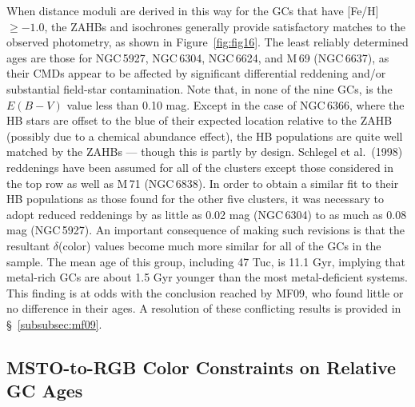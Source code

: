 \documentclass[12pt,preprint]{aastex}
\begin{document}
When distance moduli are derived in this way for the GCs that have [Fe/H] $\ge
-1.0$, the ZAHBs and isochrones generally provide satisfactory matches to the
observed photometry, as shown in Figure~\ref{fig:fig16}.  The least reliably
determined ages are those for NGC$\,$5927, NGC$\,$6304, NGC$\,$6624, and M$\,$69
(NGC$\,$6637), as their CMDs appear to be affected by significant differential
reddening and/or substantial field-star contamination.  Note that, in none of
the nine GCs, is the $E(B-V)$ value less than 0.10 mag.  Except in the case of
NGC$\,$6366, where the HB stars are offset to the blue of their expected 
location relative to the ZAHB (possibly due to a chemical abundance effect),
the HB populations are quite well matched by the ZAHBs --- though
this is partly by design.  Schlegel et al.~(1998) reddenings have been assumed
for all of the clusters except those considered in the top row as well as
M$\,$71 (NGC$\,$6838).   In order to obtain a similar fit to their HB
populations as those found for the other five clusters, it was necessary to
adopt reduced reddenings by as little as 0.02 mag (NGC$\,$6304) to as much as
0.08 mag (NGC$\,$5927).  An important consequence of making such revisions is
that the resultant $\delta$(color) values become much more similar for all of
the GCs in the sample.  The mean age of this group, including 47 Tuc, is 11.1
Gyr, implying that metal-rich GCs are about 1.5 Gyr younger than the most
metal-deficient systems.  This finding is at odds with the conclusion reached
by MF09, who found little or no difference in their ages.  A resolution of
these conflicting results is provided in \S~\ref{subsubsec:mf09}.

\subsection{MSTO-to-RGB Color Constraints on Relative GC Ages}
\label{subsec:msrg}
\end{document}
